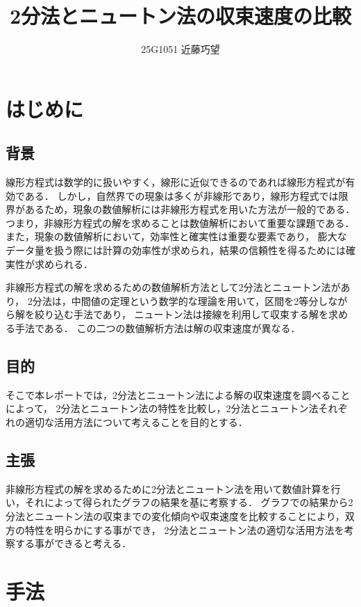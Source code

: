 \documentclass[uplatex]{jsarticle}
\begin{document}
\title{2分法とニュートン法の収束速度の比較}
\author{25G1051 近藤巧望}
\maketitle


\section{はじめに}
\subsection{背景}
線形方程式は数学的に扱いやすく，線形に近似できるのであれば線形方程式が有効である．
しかし，自然界での現象は多くが非線形であり，線形方程式では限界があるため，現象の数値解析には非線形方程式を用いた方法が一般的である\cite{ref1}．
つまり，非線形方程式の解を求めることは数値解析において重要な課題である．
また，現象の数値解析において，効率性と確実性は重要な要素であり，
膨大なデータ量を扱う際には計算の効率性が求められ，結果の信頼性を得るためには確実性が求められる\cite{ref2}．
\par
非線形方程式の解を求めるための数値解析方法として2分法とニュートン法があり，
2分法は，中間値の定理という数学的な理論を用いて，区間を2等分しながら解を絞り込む手法であり，
ニュートン法は接線を利用して収束する解を求める手法である．
この二つの数値解析方法は解の収束速度が異なる．
\par
\subsection{目的}
そこで本レポートでは，2分法とニュートン法による解の収束速度を調べることによって，
2分法とニュートン法の特性を比較し，2分法とニュートン法それぞれの適切な活用方法について考えることを目的とする．
\par
\subsection{主張}
非線形方程式の解を求めるために2分法とニュートン法を用いて数値計算を行い，それによって得られたグラフの結果を基に考察する．
グラフでの結果から2分法とニュートン法の収束までの変化傾向や収束速度を比較することにより，双方の特性を明らかにする事ができ，
2分法とニュートン法の適切な活用方法を考察する事ができると考える．



\section{手法}
\end{document}
